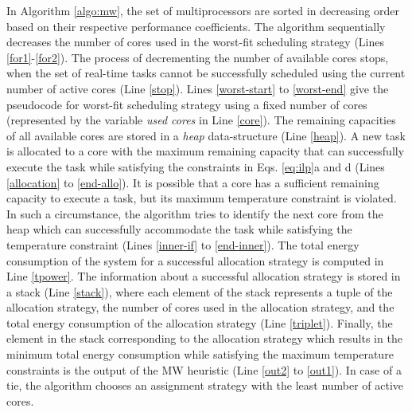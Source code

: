 \documentclass[conference]{IEEEtran}
\begin{document}
In Algorithm \ref{algo:mw},
the set of multiprocessors are sorted in decreasing order based on their respective performance coefficients.
The algorithm sequentially decreases the number of cores used in the worst-fit scheduling strategy (Lines \ref{for1}-\ref{for2}).
The process of decrementing the number of available cores stops, when the set of real-time tasks cannot be successfully scheduled using
the current number of active cores (Line \ref{stop}). %
Lines \ref{worst-start} to \ref{worst-end} give the pseudocode for worst-fit scheduling strategy using a fixed number of cores
(represented by the variable \emph{used cores} in Line \ref{core}).
The remaining capacities of all available cores are stored in a \emph{heap} data-structure (Line \ref{heap}).
A new task is allocated to a core with the maximum remaining capacity
that can successfully execute the task while satisfying the constraints in Eqs. \ref{eq:ilp}a and d (Lines \ref{allocation} to \ref{end-allo}).
It is possible that a core has a sufficient remaining capacity to execute a task, but its maximum temperature constraint
is violated. In such a circumstance, the algorithm tries to identify the next core from the heap which can successfully accommodate the task
while satisfying the temperature constraint (Lines \ref{inner-if} to \ref{end-inner}).
The total energy consumption of the system for a successful allocation strategy is computed in Line \ref{tpower}.
The information about a successful allocation strategy is stored in a stack (Line \ref{stack}), where
each element of the stack represents a tuple of the allocation strategy,  the
number of cores used in the allocation strategy, and the total energy consumption of the allocation strategy (Line \ref{triplet}).
Finally, the element in the stack corresponding to the allocation strategy which results in the minimum total energy consumption
while satisfying the maximum temperature constraints is the output of the MW heuristic (Line \ref{out2} to \ref{out1}).
In case of a tie, the algorithm chooses an assignment strategy with the least number of active cores.
\end{document}
